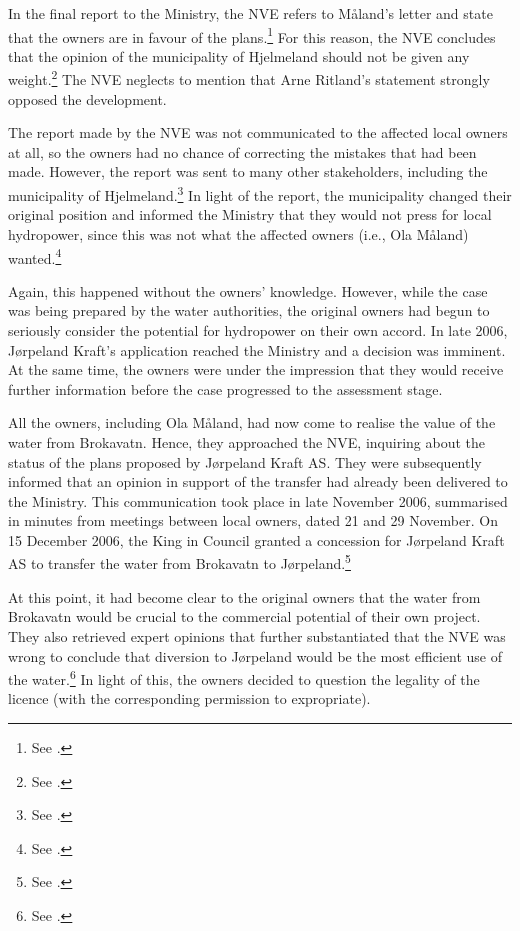 In the final report to the Ministry, the NVE refers to Måland's letter and state that the owners are in favour of the plans.\footnote{See \cite[19]{jorpeland09}.} For this reason, the NVE concludes that the opinion of the municipality of Hjelmeland should not be given any weight.\footnote{See \cite[19]{jorpeland09}.} The NVE neglects to mention that Arne Ritland's statement strongly opposed the development. %

The report made by the NVE was not communicated to the affected local owners at all, so the owners had no chance of correcting the mistakes that had been made. However, the report was sent to many other stakeholders, including the municipality of Hjelmeland.\footnote{See \cite[24]{jorpeland09}.} In light of the report, the municipality changed their original position and informed the Ministry that they would not press for local hydropower, since this was not what the affected owners (i.e., Ola Måland) wanted.\footnote{See \cite[24]{jorpeland09}.}

Again, this happened without the owners' knowledge. However, while the case was being prepared by the water authorities, the original owners had begun to seriously consider the potential for hydropower on their own accord. In late 2006, Jørpeland Kraft's application reached the Ministry and a decision was imminent. At the same time, the owners were under the impression that they would receive further information before the case progressed to the assessment stage.

All the owners, including Ola Måland, had now come to realise the value of the water from Brokavatn. Hence, they approached the NVE, inquiring about the status of the plans proposed by Jørpeland Kraft AS. They were subsequently informed that an opinion in support of the transfer had already been delivered to the Ministry. This communication took place in late November 2006, summarised in minutes from meetings between local owners, dated 21 and 29 November. On 15 December 2006, the King in Council granted a concession for Jørpeland Kraft AS to transfer the water from Brokavatn to Jørpeland.\footnote{See \cite[3]{jorpeland09}.}

At this point, it had become clear to the original owners that the water from Brokavatn would be crucial to the commercial potential of their own project. They also retrieved expert opinions that further substantiated that the NVE was wrong to conclude that diversion to Jørpeland would be the most efficient use of the water.\footnote{See \cite[23]{jorpeland09}.} In light of this, the owners decided to question the legality of the licence (with the corresponding permission to expropriate).


